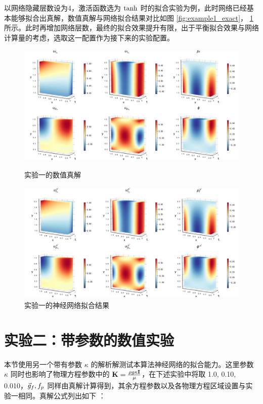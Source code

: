 以网络隐藏层数设为4，激活函数选为 $\tanh$ 时的拟合实验为例，此时网络已经基本能够拟合出真解，数值真解与网络拟合结果对比如图 \ref{fig:example1_exact}， \ref{fig:example1_fitted} 所示。此时再增加网络层数，最终的拟合效果提升有限，出于平衡拟合效果与网络计算量的考虑，选取这一配置作为接下来的实验配置。

\begin{figure}[H]
    \centering
    \includegraphics[width=0.75\linewidth]{images/example1_exact.png}
    \caption{实验一的数值真解}
    \label{fig:example1_exact}
    \includegraphics[width=0.75\linewidth]{images/example1_fitted.png}
    \caption{实验一的神经网络拟合结果}
    \label{fig:example1_fitted}
\end{figure}


\section{实验二：带参数的数值实验}

本节使用另一个带有参数 $\kappa$ 的解析解测试本算法神经网络的拟合能力。这里参数 $\kappa$ 同时也影响了物理方程参数中的 $\mathbf{K} = \frac{\rho g \kappa \mathbf{I} }{\mu}$，在下述实验中将取 1.0, 0.10, 0.010，$\vec{g}_f, f_p$ 同样由真解计算得到，其余方程参数以及各物理方程区域设置与实验一相同。真解公式列出如下 ：

